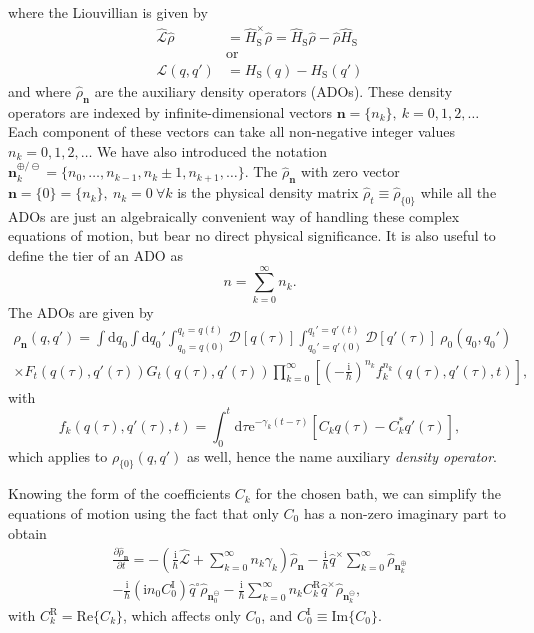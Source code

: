 where the Liouvillian is given by
\begin{equation}
	\begin{split}
	\hat{\mathcal{L}}\hat{\rho} &= \hat{H}_\mathrm{S}^\times \hat{\rho} = \hat{H}_\mathrm{S}\hat{\rho}-\hat{\rho}\hat{H}_\mathrm{S}\\
	&\text{or}\\
	\mathcal{L}(q,q') &=  H_\mathrm{S}(q)-H_\mathrm{S}(q')
	\end{split}
\end{equation}
and where $\hat{\rho}_{\bm{n}}$ are the auxiliary density operators (ADOs). These density operators are indexed by infinite-dimensional vectors $\bm{n} = \{n_k\},\ k=0,1,2,\dots$ Each component of these vectors can take all non-negative integer values $n_k = 0,1,2,\dots$ We have also introduced the notation $\bm{n}_k^{\oplus/\ominus} = \{n_0,\dots,n_{k-1},n_k\pm1,n_{k+1},\dots\}$. The $\hat{\rho}_{\bm{n}}$ with zero vector $\bm{n} = \{0\} = \{n_k\},\ n_k=0\ \forall k$ is the physical density matrix $\hat{\rho}_t \equiv \hat{\rho}_{\{0\}}$ while all the ADOs are just an algebraically convenient way of handling these complex equations of motion, but bear no direct physical significance. It is also useful to define the tier of an ADO as
\begin{equation}
	n = \sum_{k=0}^{\infty} n_k.
	\label{eq:tier}
\end{equation}
\newpage
\noindent The ADOs are given by
\begin{multline}
	\rho_{\bm{n}}(q,q') = 
\int\mathrm{d}q_0 
\int\mathrm{d}q_0'
\int_{q_0= q(0)}^{q_t = q(t)} \mathcal{D}[q(\tau)]
\int_{q_0'= q'(0)}^{q_t'= q'(t)} \mathcal{D}[q'(\tau)]
\ \rho_0(q_0,q_0')
\\
\times F_t(q(\tau),q'(\tau))G_t(q(\tau),q'(\tau))
\prod_{k=0}^{\infty}
\left[
\left(-\frac{\mathrm{i}}{\hbar}\right)^{n_k}f_k^{n_k}(q(\tau),q'(\tau),t)
\right],
\end{multline}
with
\begin{equation}
	f_k(q(\tau),q'(\tau),t) = \int_0^{t}\mathrm{d}\tau \mathrm{e}^{-\gamma_k (t-\tau)}
	[C_k q(\tau)-C_k^*q'(\tau)],
\end{equation}
which applies to $\rho_{\{0\}}(q,q')$ as well, hence the name auxiliary \emph{density operator}.

Knowing the form of the coefficients $C_k$ for the chosen bath, we can simplify the equations of motion using the fact that only $C_0$ has a non-zero imaginary part to obtain
\begin{multline}
\frac{\partial \hat{\rho}_{\bm{n}} }{\partial t} =
-\left(\frac{\mathrm{i}}{\hbar}\hat{\mathcal{L}}+\sum_{k=0}^{\infty}n_k \gamma_k \right)\hat{\rho}_{\bm{n}}
-\frac{\mathrm{i}}{\hbar}\hat{q}^\times \sum_{k=0}^{\infty}\hat{\rho}_{\bm{n}_k^\oplus} \\
-\frac{\mathrm{i}}{\hbar}(\mathrm{i} n_0 C_0^\mathrm{I})\hat{q}^\circ\hat{\rho}_{\bm{n}_0^\ominus}
-\frac{\mathrm{i}}{\hbar}\sum_{k=0}^{\infty}n_k C_k^\mathrm{R}\hat{q}^\times\hat{\rho}_{\bm{n}_k^\ominus},
\label{eq:eom_real}
\end{multline}
with $C_k^\mathrm{R} = \mathrm{Re}\{C_k\}$, which affects only $C_0$, and $C_0^\mathrm{I}\equiv \mathrm{Im}\{C_0\}$.

